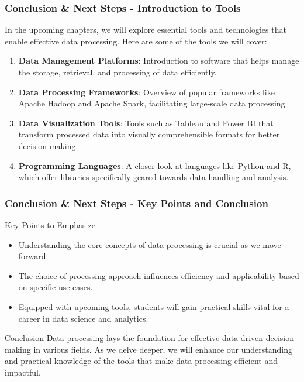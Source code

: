 \documentclass{beamer}
\begin{document}
\begin{frame}[fragile]
    \frametitle{Conclusion \& Next Steps - Introduction to Tools}
    In the upcoming chapters, we will explore essential tools and technologies that enable effective data processing. Here are some of the tools we will cover:
    
    \begin{enumerate}
        \item \textbf{Data Management Platforms}:
              Introduction to software that helps manage the storage, retrieval, and processing of data efficiently.
              
        \item \textbf{Data Processing Frameworks}:
              Overview of popular frameworks like Apache Hadoop and Apache Spark, facilitating large-scale data processing.
              
        \item \textbf{Data Visualization Tools}:
              Tools such as Tableau and Power BI that transform processed data into visually comprehensible formats for better decision-making.
              
        \item \textbf{Programming Languages}:
              A closer look at languages like Python and R, which offer libraries specifically geared towards data handling and analysis.
    \end{enumerate}
\end{frame}

\begin{frame}[fragile]
    \frametitle{Conclusion \& Next Steps - Key Points and Conclusion}
    \begin{block}{Key Points to Emphasize}
        \begin{itemize}
            \item Understanding the core concepts of data processing is crucial as we move forward.
            \item The choice of processing approach influences efficiency and applicability based on specific use cases.
            \item Equipped with upcoming tools, students will gain practical skills vital for a career in data science and analytics.
        \end{itemize}
    \end{block}

    \begin{block}{Conclusion}
        Data processing lays the foundation for effective data-driven decision-making in various fields. As we delve deeper, we will enhance our understanding and practical knowledge of the tools that make data processing efficient and impactful.
    \end{block}
\end{frame}
\end{document}

